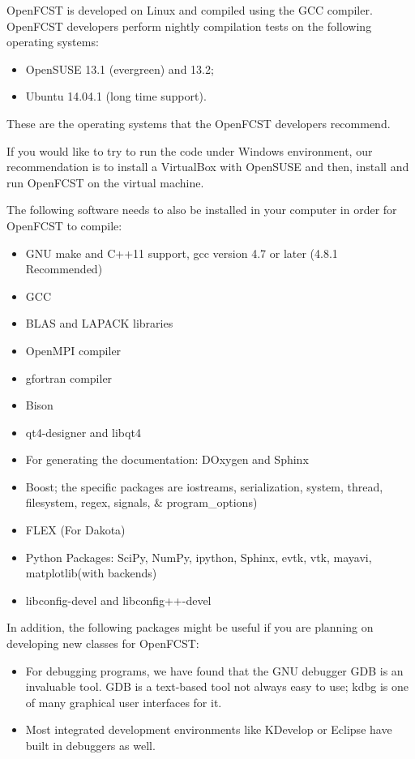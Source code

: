 OpenFCST is developed on Linux and compiled using the GCC compiler. OpenFCST developers perform nightly compilation tests on the following operating systems:
\begin{itemize}
 \item OpenSUSE 13.1 (evergreen) and 13.2;
 \item Ubuntu 14.04.1 (long time support).
\end{itemize}
These are the operating systems that the OpenFCST developers recommend. 

If you would like to try to run the code under Windows environment, our recommendation is to install a VirtualBox with OpenSUSE and then, install and run OpenFCST on the virtual machine.

The following software needs to also be installed in your computer in order for OpenFCST to compile:
\begin{itemize}
 \item GNU make and C++11 support, gcc version 4.7 or later (4.8.1 Recommended)
 \item GCC
 \item BLAS and LAPACK libraries 
 \item OpenMPI compiler
 \item gfortran compiler
 \item Bison
 \item qt4-designer and libqt4
 \item For generating the documentation: DOxygen and Sphinx
 \item Boost; the specific packages are iostreams, serialization, system, thread, 
       filesystem, regex, signals, \& program\_options)
 \item FLEX (For Dakota)
 \item Python Packages: SciPy, NumPy, ipython, Sphinx, evtk, vtk, mayavi, matplotlib(with backends)
 \item libconfig-devel and libconfig++-devel
\end{itemize}

In addition, the following packages might be useful if you are planning on developing new classes for OpenFCST:
\begin{itemize}
  \item For debugging programs, we have found that the GNU debugger GDB is an invaluable tool. GDB is a text-based tool not always easy to use; kdbg is one of many graphical user interfaces for it. \item Most integrated development environments like KDevelop or Eclipse have built in debuggers as well.
\end{itemize}

